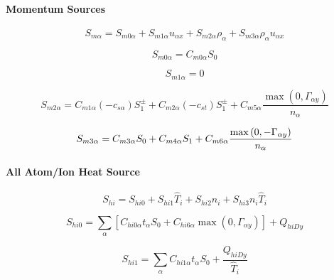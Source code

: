 \documentclass[11pt]{article}
\begin{document}
\bigskip

\paragraph{Momentum Sources}

\begin{equation}
S_{m\alpha}=S_{m0\alpha}+S_{m1\alpha}u_{\alpha x}+S_{m2\alpha}\rho_{\alpha
}+S_{m3\alpha}\rho_{\alpha}u_{\alpha x}   \label{24}
\end{equation}

\begin{equation}
S_{m0\alpha}=C_{m0\alpha}S_{0}   \label{25}
\end{equation}

\begin{equation}
S_{m1\alpha}=0   \label{26}
\end{equation}

\begin{equation}
S_{m2\alpha}=C_{m1\alpha}\left( -c_{s\alpha}\right) S_{1}^{\pm}+C_{m2\alpha
}\left( -c_{st}\right) S_{1}^{\pm}+C_{m5\alpha}\frac{\max\left(
0,\Gamma_{\alpha y}\right) }{n_{\alpha}}   \label{27}
\end{equation}

\begin{equation}
S_{m3\alpha}=C_{m3\alpha}S_{0}+C_{m4\alpha}S_{1}+C_{m6\alpha}\frac{%
\max\left( 0,-\Gamma_{\alpha y}\right) }{n_{\alpha}}   \label{28}
\end{equation}

\bigskip

\paragraph{All Atom/Ion Heat Source}

\begin{equation}
S_{hi}=S_{hi0}+S_{hi1}\widehat{T}_{i}+S_{hi2}n_{i}+S_{hi3}n_{i}\widehat{T}%
_{i}   \label{29}
\end{equation}

\begin{equation}
S_{hi0}=\sum_{\alpha}\left[ C_{hi0\alpha}t_{\alpha}S_{0}+C_{hi6\alpha}\max%
\left( 0,\Gamma_{\alpha y}\right) \right] +Q_{hiDy}   \label{30}
\end{equation}

\begin{equation}
S_{hi1}=\sum_{\alpha}C_{hi1\alpha}t_{\alpha}S_{0}+\frac{Q_{hiDy}}{\widehat
{T}_{i}}   \label{31}
\end{equation}
\end{document}
